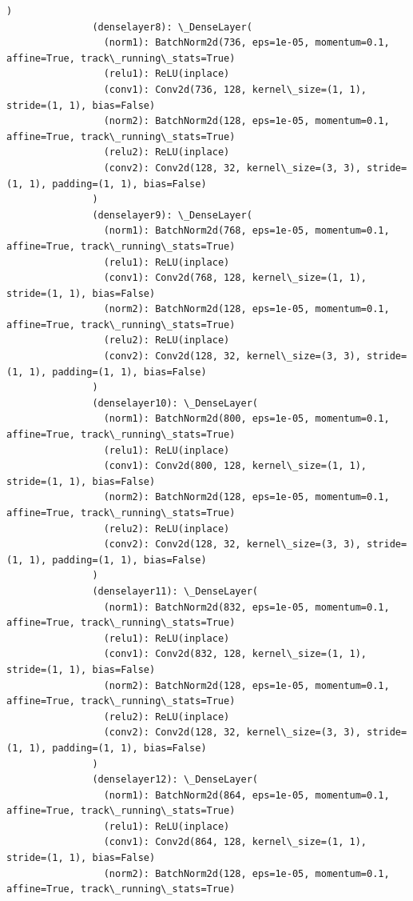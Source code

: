 \documentclass[11pt]{article}
\begin{document}
\begin{Verbatim}[commandchars=\\\{\}]
               )
               (denselayer8): \_DenseLayer(
                 (norm1): BatchNorm2d(736, eps=1e-05, momentum=0.1, affine=True, track\_running\_stats=True)
                 (relu1): ReLU(inplace)
                 (conv1): Conv2d(736, 128, kernel\_size=(1, 1), stride=(1, 1), bias=False)
                 (norm2): BatchNorm2d(128, eps=1e-05, momentum=0.1, affine=True, track\_running\_stats=True)
                 (relu2): ReLU(inplace)
                 (conv2): Conv2d(128, 32, kernel\_size=(3, 3), stride=(1, 1), padding=(1, 1), bias=False)
               )
               (denselayer9): \_DenseLayer(
                 (norm1): BatchNorm2d(768, eps=1e-05, momentum=0.1, affine=True, track\_running\_stats=True)
                 (relu1): ReLU(inplace)
                 (conv1): Conv2d(768, 128, kernel\_size=(1, 1), stride=(1, 1), bias=False)
                 (norm2): BatchNorm2d(128, eps=1e-05, momentum=0.1, affine=True, track\_running\_stats=True)
                 (relu2): ReLU(inplace)
                 (conv2): Conv2d(128, 32, kernel\_size=(3, 3), stride=(1, 1), padding=(1, 1), bias=False)
               )
               (denselayer10): \_DenseLayer(
                 (norm1): BatchNorm2d(800, eps=1e-05, momentum=0.1, affine=True, track\_running\_stats=True)
                 (relu1): ReLU(inplace)
                 (conv1): Conv2d(800, 128, kernel\_size=(1, 1), stride=(1, 1), bias=False)
                 (norm2): BatchNorm2d(128, eps=1e-05, momentum=0.1, affine=True, track\_running\_stats=True)
                 (relu2): ReLU(inplace)
                 (conv2): Conv2d(128, 32, kernel\_size=(3, 3), stride=(1, 1), padding=(1, 1), bias=False)
               )
               (denselayer11): \_DenseLayer(
                 (norm1): BatchNorm2d(832, eps=1e-05, momentum=0.1, affine=True, track\_running\_stats=True)
                 (relu1): ReLU(inplace)
                 (conv1): Conv2d(832, 128, kernel\_size=(1, 1), stride=(1, 1), bias=False)
                 (norm2): BatchNorm2d(128, eps=1e-05, momentum=0.1, affine=True, track\_running\_stats=True)
                 (relu2): ReLU(inplace)
                 (conv2): Conv2d(128, 32, kernel\_size=(3, 3), stride=(1, 1), padding=(1, 1), bias=False)
               )
               (denselayer12): \_DenseLayer(
                 (norm1): BatchNorm2d(864, eps=1e-05, momentum=0.1, affine=True, track\_running\_stats=True)
                 (relu1): ReLU(inplace)
                 (conv1): Conv2d(864, 128, kernel\_size=(1, 1), stride=(1, 1), bias=False)
                 (norm2): BatchNorm2d(128, eps=1e-05, momentum=0.1, affine=True, track\_running\_stats=True)

\end{Verbatim}
\end{document}
